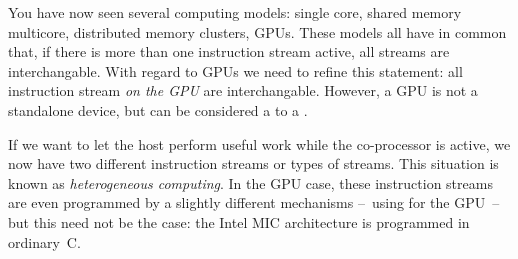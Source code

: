You have now seen several computing models: single core, shared memory
multicore, distributed memory clusters, GPUs. These models all have in
common that, if there is more than one instruction stream active, all
streams are interchangable. With regard to GPUs we need to refine this
statement: all instruction stream \emph{on the GPU} are
interchangable. However, a GPU is not a standalone device, but can be
considered a  to a . 

If we want to let the host perform useful work while the co-processor
is active, we now have two different instruction streams or types of
streams. This situation is known as \emph{heterogeneous computing}.
In the GPU case, these instruction streams are even
programmed by a slightly different mechanisms --~using
 for the GPU~-- but this need not be the case: the
 Intel \acf{MIC} architecture is programmed in
ordinary~C.
